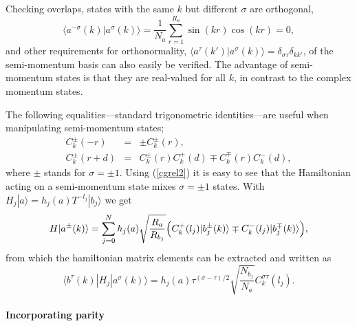 \documentclass[draft,numberedheadings]{aipproc}
\begin{document}
Checking overlaps, states with the same $k$ but different $\sigma$ are orthogonal,
\begin{equation}
\langle a^{-\sigma}(k)|a^\sigma(k)\rangle = \frac{1}{N_a} \sum_{r=1}^{R_a} \sin(kr)\cos(kr) = 0,
\label{olapsemi}
\end{equation}
and other requirements for orthonormality, $\langle a^{\tau}(k')|a^\sigma(k)\rangle = \delta_{\sigma\tau}\delta_{kk'}$, of the semi-momentum basis 
can also easily be verified. The advantage of semi-momentum states is that they are real-valued for all $k$, in contrast to the complex momentum states.

The following equalities---standard trigonometric identities---are useful when manipulating semi-momentum states; 
\begin{eqnarray}
C^\pm_k(-r) &=&  \pm C^\pm_k(r), \label{cgrel1} \\
C^\pm_k(r + d) &=& C^\pm_k(r)C^+_k(d) \mp C^{\mp}_k(r)C^{-}_k(d),\label{cgrel2}
\end{eqnarray}
where $\pm$ stands for $\sigma=\pm 1$. Using (\ref{cgrel2}) it is easy to see that the Hamiltonian acting on a semi-momentum state mixes
$\sigma=\pm 1$ states. With $H_j|a\rangle = h_j(a) T^{-l_j}|b_j\rangle$ we get
\begin{equation}
H|a^\pm(k)\rangle = \sum_{j=0}^N h_j(a)\sqrt{\frac{R_a}{R_{b_j}}} 
\Bigl ( C^+_k(l_j)|b^\pm_j(k)\rangle \mp C^{-}_k(l_j)|b^{\mp}_j(k)\rangle \Bigr ),
\end{equation}
from which the hamiltonian matrix elements can be extracted and written as
\begin{equation}
\langle b^{\tau}(k)|H_j|a^\sigma(k)\rangle = 
h_j(a)\tau^{(\sigma-\tau)/2}\sqrt{\frac{N_{b_j}}{N_a}} C^{\sigma\tau}_k(l_j).
\label{hamkg}
\end{equation}

\paragraph{Incorporating parity}
\end{document}

